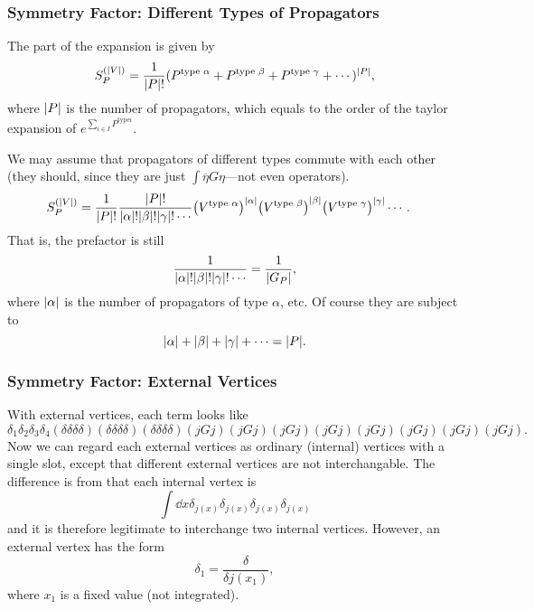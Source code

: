 \documentclass{article}
\begin{document}
\subsubsection{Symmetry Factor: Different Types of Propagators}

The  part of the expansion is given by
\[ S^{(\abs{V})}_P = \frac{1}{\abs{P}!} (P^{\text{type }\alpha} + P^{\text{type }\beta} + P^{\text{type }\gamma} + \cdots)^{\abs{P}}, \]
where $\abs{P}$ is the number of propagators, which equals to the order of the taylor expansion of $e^{\sum_{i\in I} P^{\text{type} i} }$.
\par
We may assume that propagators of different types commute with each other (they should, since they are just $\int \overline{\eta} G \eta$---not even operators).
\begin{align*}
    & S^{(\abs{V})}_P = \frac{1}{\abs{P}!} \frac{\abs{P}!}{\abs{\alpha}! \abs{\beta}! \abs{\gamma}! \cdots} \qty(V^{\text{type }\alpha})^{\abs{\alpha}}\qty(V^{\text{type }\beta})^{\abs{\beta}}\qty(V^{\text{type }\gamma})^{\abs{\gamma}}\cdots.
\end{align*}
That is, the prefactor is still
\[ \frac{1}{\abs{\alpha}! \abs{\beta}! \abs{\gamma}! \cdots} = \frac{1}{\abs{G_P}}, \]
where $\abs{\alpha}$ is the number of propagators of type $\alpha$, etc.
Of course they are subject to
\[ \abs{\alpha} + \abs{\beta} + \abs{\gamma} + \cdots = \abs{P}. \]

\subsubsection{Symmetry Factor: External Vertices}
\label{sssec:ext_vertex}

With external vertices, each term looks like
\[ \delta_1\delta_2\delta_3\delta_4(\delta\delta\delta\delta)(\delta\delta\delta\delta)(\delta\delta\delta\delta)(jGj)(jGj)(jGj)(jGj)(jGj)(jGj)(jGj)(jGj). \]
Now we can regard each external vertices as ordinary (internal) vertices with a single slot, except that different external vertices are not interchangable.
The difference is from that each internal vertex is
\[ \int \dd{x} \delta_{j(x)} \delta_{j(x)} \delta_{j(x)} \delta_{j(x)} \]
and it is therefore legitimate to interchange two internal vertices.
However, an external vertex has the form
\[ \delta_1 = \frac{\delta}{\delta j(x_1)}, \]
where $x_1$ is a fixed value (not integrated).
\end{document}
